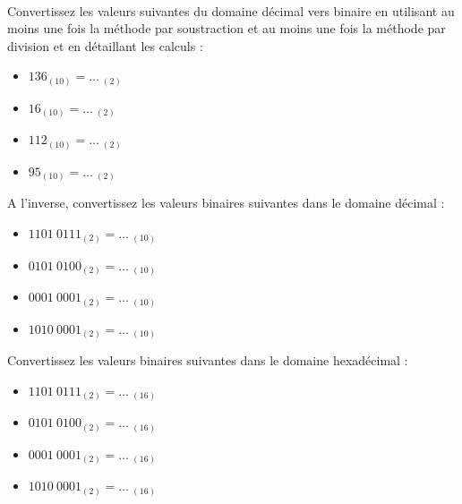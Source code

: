 \documentclass[10pt,fleqn]{article} %
\begin{document}
\begin{exercise}~

\begin{question}
Convertissez les valeurs suivantes du domaine décimal vers binaire en utilisant au moins une fois la méthode par soustraction et au moins une fois la méthode par division et en détaillant les calculs : 
  \begin{itemize}
      \item $136_{(10)} = \dots~_{(2)}$
      \item $16_{(10)} = \dots~_{(2)}$
      \item $112_{(10)} = \dots~_{(2)}$
      \item $95_{(10)} = \dots~_{(2)}$
  \end{itemize}
\end{question} 


\begin{question}
A l'inverse, convertissez les valeurs binaires suivantes dans le domaine décimal : 
\begin{itemize}
    \item $1101~0111 _{(2)}  = \dots~_{(10)}$
    \item $0101~0100 _{(2)}  = \dots~_{(10)} $
    \item $0001~0001 _{(2)} = \dots~_{(10)} $
    \item $1010~0001 _{(2)} = \dots~_{(10)} $
\end{itemize}
\end{question}

\begin{question}
Convertissez les valeurs binaires suivantes dans le domaine hexadécimal : 
\begin{itemize}
    \item $1101~0111 _{(2)}  = \dots~_{(16)}$
    \item $0101~0100 _{(2)}  = \dots~_{(16)} $
    \item $0001~0001 _{(2)} = \dots~_{(16)} $
    \item $1010~0001 _{(2)} = \dots~_{(16)} $
\end{itemize}
\end{question}
\end{exercise}
\end{document}
